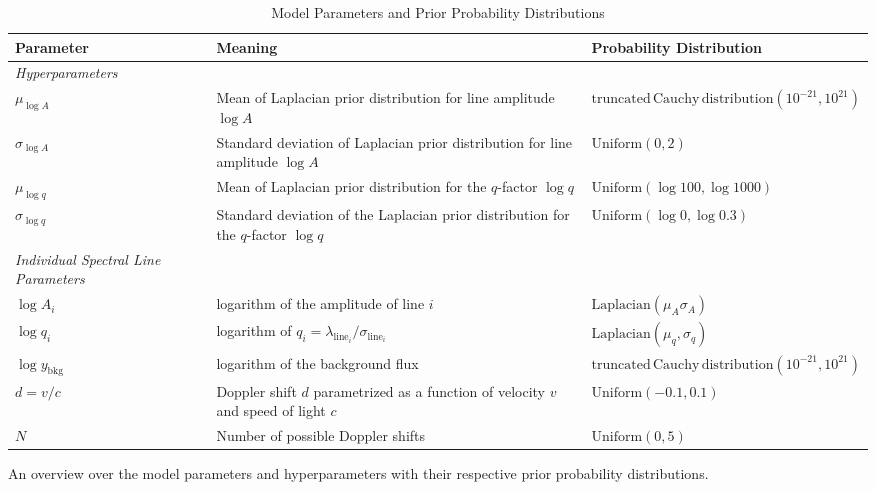 \documentclass[12pt]{emulateapj}
\newcommand{\counts}{y}
\begin{document}
\begin{table*}[hbtp]
\renewcommand{\arraystretch}{1.3}
\footnotesize
\caption{Model Parameters and Prior Probability Distributions}
\begin{threeparttable} 
\begin{tabularx}{\textwidth}{p{4.0cm}p{7.0cm}X}%
\toprule
\bf{Parameter} & \bf{Meaning} & \bf{Probability Distribution} \\ \midrule
\it{Hyperparameters} && \\ \midrule
$\mu_{\log{A}}$ & Mean of Laplacian prior distribution for line amplitude $\log{A}$ &   $\mathrm{truncated\, Cauchy\, distribution}(10^{-21}, 10^{21})$  \\
$\sigma_{\log{A}}$ & Standard deviation of Laplacian prior distribution for line amplitude $\log{A}$ & $\mathrm{Uniform}(0,2)$ \\
$\mu_{\log{q}}$ & Mean of Laplacian prior distribution for the $q$-factor $\log{q}$ & $\mathrm{Uniform}(\log{100}, \log{1000})$  \\
$\sigma_{\log{q}}$ & Standard deviation of the Laplacian prior distribution for the $q$-factor $\log{q}$ & $\mathrm{Uniform}(\log{0}, \log{0.3})$\\ 
\midrule
\it{Individual Spectral Line Parameters} && \\ \midrule
$\log{A_i}$ & logarithm of the amplitude of line $i$ & $\mathrm{Laplacian}(\mu_A \sigma_A)$ \\
$\log{q_i}$ & logarithm of $q_i = \lambda_{\mathrm{line}_{i}}/\sigma_{\mathrm{line}_{i}}$ & $\mathrm{Laplacian}(\mu_q, \sigma_q)$ \\
$\log{\counts}_{\mathrm{bkg}}$ & logarithm of the background flux & $\mathrm{truncated\, Cauchy\, distribution}(10^{-21}, 10^{21})$ \\
$d = v/c$ & Doppler shift $d$ parametrized as a function of velocity $v$ and speed of light $c$ & $\mathrm{Uniform}(-0.1, 0.1)$ \\
$N$ & Number of possible Doppler shifts & $\mathrm{Uniform}(0,5)$  \\\bottomrule
\end{tabularx}
   \begin{tablenotes}
      \item{An overview over the model parameters and hyperparameters with their respective prior probability distributions.}

\end{tablenotes}
\end{threeparttable}
\end{table*}
\end{document}

